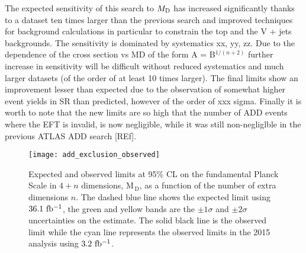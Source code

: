The expected sensitivity of this search to $M_\mathrm{D}$ has increased significantly
thanks to a dataset ten times larger than the previous search and improved
techniques for background calculations in particular to constrain the top and
the V + jets backgrounds. The sensitivity is dominated by systematics xx, yy,
zz. Due to the dependence of the cross section vs MD of the form A =
B$^{1/(n+2)}$ further increase in sensitivity will be difficult without reduced
systematics and much larger datasets (of the order of at least 10 times
larger). The final limits show an improvement lesser than expected due to the
observation of somewhat higher event yields in SR than predicted, however of the
order of xxx sigma. Finally it is worth to note that the new limits are so high
that the number of ADD events where the EFT is invalid, is now negligible, while
it was still non-negliglble in the previous ATLAS ADD search [REf].
\begin{figure}
  \centering
  \texttt{[image: add\_exclusion\_observed]}
  \caption{Expected and observed limits at 95\% CL on the fundamental Planck
    Scale in $4 + n$ dimensions, M$_\mathrm{\, D}$, as a function of the number
    of extra dimensions $n$. The dashed blue line shows the expected limit using
    $36.1~\mbox{fb$^{-1}$}$, the green and yellow bands are the $\pm 1 \sigma$ and
    $\pm 2 \sigma$ uncertainties on the estimate. The solid black line is the
    observed limit while the cyan line represents the observed limits in the
    2015 analysis using $3.2~\mbox{fb$^{-1}$}$.}
  \label{fig:add_observed}
\end{figure}
